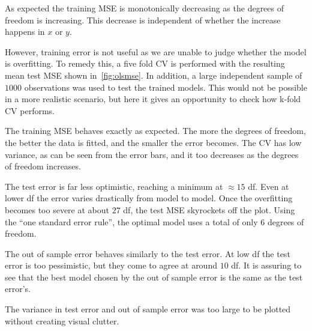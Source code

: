 As expected the training MSE is monotonically decreasing as the degrees of
freedom is increasing. This decrease is independent of whether the increase
happens in \(x\) or \(y\).

However, training error is not useful as we are unable to judge whether the
model is overfitting. To remedy this, a five fold CV is performed with the
resulting mean test MSE shown in~\cref{fig:olsmse}. In addition,  a large independent sample of
\(1000\) observations was used to test the trained models. This would not be
possible in a more realistic scenario, but here it gives an opportunity to check
how k-fold CV performs.

The training MSE behaves exactly as expected. The more the degrees of freedom,
the better the data is fitted, and the smaller the error becomes. The CV has low
variance, as can be seen from the error bars, and it too decreases as the
degrees of freedom increases.

The test error is far less optimistic, reaching a minimum at \(\approx 15\) df.
Even at lower df the error varies drastically from model to model. Once the
overfitting becomes too severe at about \(27\) df, the test MSE skyrockets off
the plot. Using the ``one standard error rule'', the optimal model uses a total
of only \(6\) degrees of freedom.

The out of sample error behaves similarly to the test error. At low df the
test error is too pessimistic, but they come to agree at around \(10\) df.
It is assuring to see that the best model chosen by the out of sample error is
the same as the test error's. 

The variance in test error and out of sample error was too large to be plotted
without creating visual clutter.

